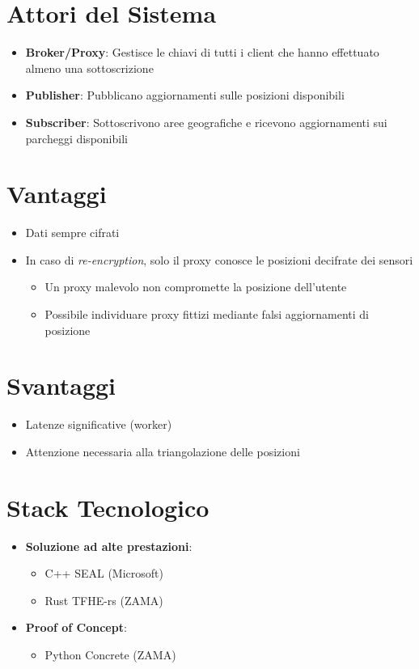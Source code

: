 \documentclass[12pt,a4paper,twoside]{book}
\begin{document}
\section{Attori del Sistema}
\begin{itemize}
    \item \textbf{Broker/Proxy}: Gestisce le chiavi di tutti i client che hanno effettuato almeno una sottoscrizione
    \item \textbf{Publisher}: Pubblicano aggiornamenti sulle posizioni disponibili
    \item \textbf{Subscriber}: Sottoscrivono aree geografiche e ricevono aggiornamenti sui parcheggi disponibili
\end{itemize}

\section{Vantaggi}
\begin{itemize}
    \item Dati sempre cifrati
    \item In caso di \emph{re-encryption}, solo il proxy conosce le posizioni decifrate dei sensori
    \begin{itemize}
        \item Un proxy malevolo non compromette la posizione dell'utente
        \item Possibile individuare proxy fittizi mediante falsi aggiornamenti di posizione
    \end{itemize}
\end{itemize}

\section{Svantaggi}
\begin{itemize}
    \item Latenze significative (worker)
    \item Attenzione necessaria alla triangolazione delle posizioni
\end{itemize}

\section{Stack Tecnologico}
\begin{itemize}
    \item \textbf{Soluzione ad alte prestazioni}:
    \begin{itemize}
        \item C++ SEAL (Microsoft)
        \item Rust TFHE-rs (ZAMA)
    \end{itemize}
    \item \textbf{Proof of Concept}:
    \begin{itemize}
        \item Python Concrete (ZAMA)
    \end{itemize}
\end{itemize}
\end{document}
